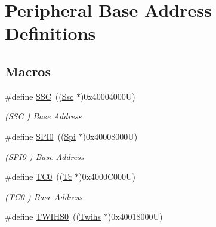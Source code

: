 \hypertarget{group__SAME70J19__base}{}\section{Peripheral Base Address Definitions}
\label{group__SAME70J19__base}
\subsection*{Macros}
\begin{DoxyCompactItemize}
\item 
\mbox{\label{group__SAME70J19__base_ga576a041994d29953cdad012ee1b2acc9}} 
\#define \mbox{\hyperlink{group__SAME70J19__base_ga576a041994d29953cdad012ee1b2acc9}{S\+SC}}~((\mbox{\hyperlink{structSsc}{Ssc}}    $\ast$)0x40004000\+U)
\begin{DoxyCompactList}\small\item\em (S\+SC ) Base Address \end{DoxyCompactList}\item 
\mbox{\label{group__SAME70J19__base_gaf26e39c91b262cc480085abcc450d3d5}} 
\#define \mbox{\hyperlink{group__SAME70J19__base_gaf26e39c91b262cc480085abcc450d3d5}{S\+P\+I0}}~((\mbox{\hyperlink{structSpi}{Spi}}    $\ast$)0x40008000\+U)
\begin{DoxyCompactList}\small\item\em (S\+P\+I0 ) Base Address \end{DoxyCompactList}\item 
\mbox{\label{group__SAME70J19__base_ga52e2ffca944a6935b5ac85cfa8157f34}} 
\#define \mbox{\hyperlink{group__SAME70J19__base_ga52e2ffca944a6935b5ac85cfa8157f34}{T\+C0}}~((\mbox{\hyperlink{structTc}{Tc}}     $\ast$)0x4000\+C000\+U)
\begin{DoxyCompactList}\small\item\em (T\+C0 ) Base Address \end{DoxyCompactList}\item 
\mbox{\label{group__SAME70J19__base_ga8609c073872964dc0295596dee0d6bcd}} 
\#define \mbox{\hyperlink{group__SAME70J19__base_ga8609c073872964dc0295596dee0d6bcd}{T\+W\+I\+H\+S0}}~((\mbox{\hyperlink{structTwihs}{Twihs}}  $\ast$)0x40018000\+U)

\end{DoxyCompactItemize}
